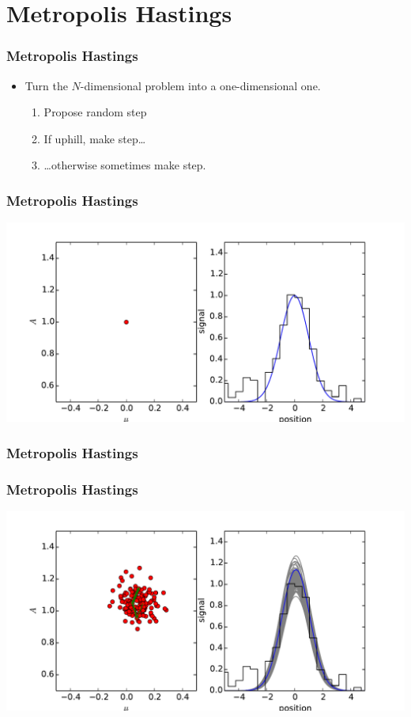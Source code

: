 \documentclass[%
]{beamer}
\begin{document}
\section{Metropolis Hastings}


\begin{frame}
  \frametitle{Metropolis Hastings} 
  \begin{itemize}
      
    \item Turn the $N$-dimensional problem into a one-dimensional one.
      \begin{enumerate}
        \item Propose random step
        \item If uphill, make step\ldots
          
        \item \ldots otherwise sometimes make step. 
      \end{enumerate}
  \end{itemize}
\end{frame}

\begin{frame}
  \frametitle{Metropolis Hastings} 
  \includegraphics[width=\textwidth]{movies/MCMC_0.pdf}
\end{frame}
\begin{frame}
  \frametitle{Metropolis Hastings} 
\end{frame}
\begin{frame}
  \frametitle{Metropolis Hastings} 
  \includegraphics[width=\textwidth]{movies/MCMC_1.pdf}
\end{frame}
\end{document}
